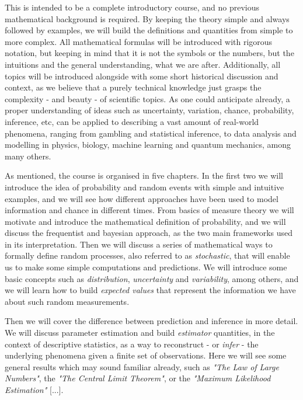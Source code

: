 \documentclass{book}
\begin{document}
This is intended to be a complete introductory course, and no previous mathematical background is required. By keeping the theory simple and always followed by examples, we will build the definitions and quantities from simple to more complex. All mathematical formulas will be introduced with rigorous notation, but keeping in mind that it is not the symbols or the numbers, but the intuitions and the general understanding, what we are after. Additionally, all topics will be introduced alongside with some short historical discussion and context, as we believe that a purely technical knowledge just grasps the complexity - and beauty - of scientific topics. As one could anticipate already, a proper understanding of  ideas such as uncertainty, variation, chance, probability, inference, etc, can be applied to describing a vast amount of real-world phenomena, ranging from gambling and statistical inference, to data analysis and modelling in physics, biology, machine learning and quantum mechanics, among many others.

\medskip

As mentioned, the course is organised in five chapters. In the first two we will introduce the idea of probability and random events with simple and intuitive examples, and we will see how different approaches have been used to model information and chance in different times. From basics of measure theory we will motivate and introduce the mathematical definition of probability, and we will discuss the frequentist and bayesian approach, as the two main frameworks used in its interpretation. Then we will discuss a series of mathematical ways to formally define random processes, also referred to as \textit{stochastic}, that will enable us to make some simple computations and predictions. We will introduce some basic concepts such as \textit{distribution}, \textit{uncertainty} and \textit{variability}, among others, and we will learn how to build \textit{expected values} that represent the information we have about such random measurements.

\medskip

Then we will cover the difference between prediction and inference in more detail. We will discuss parameter estimation and build \textit{estimator} quantities, in the context of descriptive statistics, as a way to reconstruct - or \textit{infer} - the underlying phenomena given a finite set of observations. Here we will see some general results which may sound familiar already, such as \textit{"The Law of Large Numbers"}, the \textit{"The Central Limit Theorem"}, or the \textit{"Maximum Likelihood Estimation"} [...].
\end{document}
